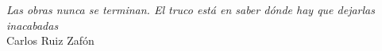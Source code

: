 \thispagestyle{empty}

\vspace*{\fill}
\begin{flushright}
\textit{Las obras nunca se terminan. El truco est\'a en saber d\'onde hay que dejarlas inacabadas} \\
\vspace{0.05in}
Carlos Ruiz Zaf\'on
\end{flushright}
\vspace*{\fill}
